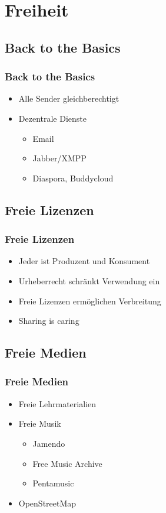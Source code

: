 \documentclass{beamer}
\begin{document}
\section{Freiheit}

\subsection{Back to the Basics}

\begin{frame}
  \frametitle{Back to the Basics}
  \begin{itemize}
    \item<2-> Alle Sender gleichberechtigt
    \item<3-> Dezentrale Dienste
      \begin{itemize}
        \item<4-> Email
        \item<5-> Jabber/XMPP
        \item<6-> Diaspora, Buddycloud
      \end{itemize}
  \end{itemize}
\end{frame}

\subsection{Freie Lizenzen}

\begin{frame}
  \frametitle{Freie Lizenzen}
  \begin{itemize}
    \item<2-> Jeder ist Produzent und Konsument
    \item<3-> Urheberrecht schränkt Verwendung ein
    \item<4-> Freie Lizenzen ermöglichen Verbreitung
    \item<5-> Sharing is caring
  \end{itemize}
\end{frame}

\subsection{Freie Medien}

\begin{frame}
  \frametitle{Freie Medien}
  \begin{itemize}
    \item<2-> Freie Lehrmaterialien
    \item<3-> Freie Musik
      \begin{itemize}
        \item Jamendo
        \item Free Music Archive
        \item Pentamusic
      \end{itemize}
    \item<4-> OpenStreetMap
  \end{itemize}
\end{frame}
\end{document}
